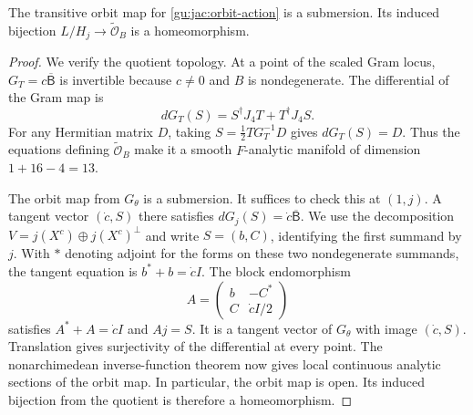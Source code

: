\begin{lemma}\label{gu:jac:orbit-topology}
The transitive orbit map for \eqref{gu:jac:orbit-action} is a submersion.
Its induced bijection $L/H_j\to\widetilde{\mathcal O}_B$ is a
homeomorphism.
\end{lemma}
\begin{proof}
We verify the quotient topology. At a point of the scaled Gram locus,
$G_T=c\overline{\mathsf B}$ is invertible because $c\ne0$ and $B$ is
nondegenerate. The differential of the Gram map is
\[
 dG_T(S)=S^\dagger J_4T+T^\dagger J_4S.
\]
For any Hermitian matrix $D$, taking
$S=\tfrac12TG_T^{-1}D$ gives $dG_T(S)=D$.  Thus the equations defining
$\widetilde{\mathcal O}_B$ make it a smooth $F$-analytic manifold of
dimension $1+16-4=13$.

The orbit map from $G_\theta$ is a submersion.  It suffices to check this at
$(1,j)$.  A tangent vector $(\dot c,S)$ there satisfies
$dG_j(S)=\dot c\overline{\mathsf B}$. We use the decomposition
$V=j(X^c)\oplus j(X^c)^\perp$ and write $S=(b,C)$, identifying the first
summand by $j$.  With $*$ denoting adjoint for the forms on these two
nondegenerate summands, the tangent equation is $b^*+b=\dot c I$.
The block endomorphism
\[
 A=\begin{pmatrix}b&-C^*\\C&\dot c I/2\end{pmatrix}
\]
satisfies $A^*+A=\dot c I$ and $Aj=S$.  It is a tangent vector of $G_\theta$
with image $(\dot c,S)$.  Translation gives surjectivity of the
differential at every point.  The nonarchimedean inverse-function
theorem now gives local continuous analytic sections of the orbit map.
In particular, the orbit map is open.  Its induced bijection from the
quotient is therefore a homeomorphism.
\end{proof}
